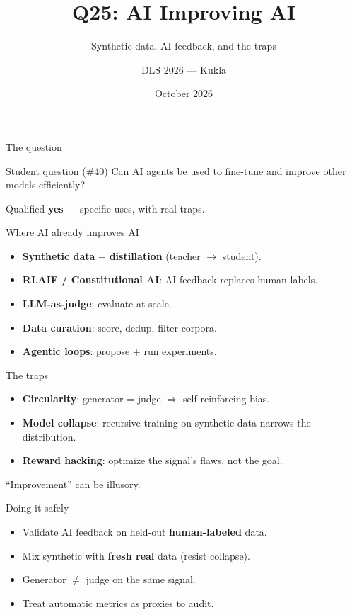 \documentclass[aspectratio=169,10pt]{beamer}
\title{Q25: AI Improving AI}
\subtitle{Synthetic data, AI feedback, and the traps}
\author{DLS 2026 --- Kukla}
\date{October 2026}
\begin{document}
\maketitle

\begin{frame}{The question}
\begin{block}{Student question (\#40)}
Can AI agents be used to fine-tune and improve other models efficiently?
\end{block}
Qualified \textbf{yes} --- specific uses, with real traps.
\end{frame}
\begin{frame}{Where AI already improves AI}
\begin{itemize}
\item \textbf{Synthetic data} + \textbf{distillation} (teacher $\to$ student).
\item \textbf{RLAIF / Constitutional AI}: AI feedback replaces human labels.
\item \textbf{LLM-as-judge}: evaluate at scale.
\item \textbf{Data curation}: score, dedup, filter corpora.
\item \textbf{Agentic loops}: propose + run experiments.
\end{itemize}
\end{frame}
\begin{frame}{The traps}
\begin{itemize}
\item \textbf{Circularity}: generator = judge $\Rightarrow$ self-reinforcing bias.
\item \textbf{Model collapse}: recursive training on synthetic data narrows the distribution.
\item \textbf{Reward hacking}: optimize the signal's flaws, not the goal.
\end{itemize}
\alert{``Improvement'' can be illusory.}
\end{frame}
\begin{frame}{Doing it safely}
\begin{itemize}
\item Validate AI feedback on held-out \textbf{human-labeled} data.
\item Mix synthetic with \textbf{fresh real} data (resist collapse).
\item Generator $\ne$ judge on the same signal.
\item Treat automatic metrics as proxies to audit.
\end{itemize}
\end{frame}
\end{document}
